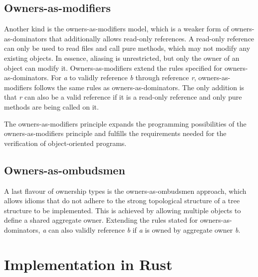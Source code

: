 \documentclass[sigplan,11pt,nonacm]{acmart}
\begin{document}
\subsection{Owners-as-modifiers}

Another kind is the owners-as-modifiers model, which is a weaker form of owners-as-dominators that additionally allows read-only references.
A read-only reference can only be used to read files and call pure methods, which may not modify any existing objects.
In essence, aliasing is unrestricted, but only the owner of an object can modify it.
Owners-as-modifiers extend the rules specified for owners-as-dominators.
For \emph{a} to validly reference \emph{b} through reference \emph{r}, owners-as-modifiers follows the same rules as owners-as-dominators.
The only addition is that \emph{r} can also be a valid reference if it is a read-only reference and only pure methods are being called on it.

The owners-as-modifiers principle expands the programming possibilities of the owners-as-modifiers principle and fulfills the requirements needed for the verification of object-oriented programs.

\cite{ownership-types-survey}


\subsection{Owners-as-ombudsmen}

A last flavour of ownership types is the owners-as-ombudsmen approach, which allows idioms that do not adhere to the strong topological structure of a tree structure to be implemented.
This is achieved by allowing multiple objects to define a shared aggregate owner.
Extending the rules stated for owners-as-dominators, \emph{a} can also validly reference \emph{b} if \emph{a} is owned by aggregate owner \emph{b}.

\cite{ownership-types-survey}




\section{Implementation in Rust}
\end{document}
